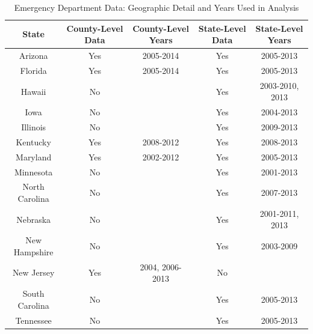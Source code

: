 \documentclass[12pt]{article}
\begin{document}
\begin{table}[]
\centering
\caption{Emergency Department Data: Geographic Detail and Years Used in Analysis}
\label{my-label}
\begin{tabular}{@{}ccccc@{}}
\toprule
State          & County-Level Data & County-Level Years           & State-Level Data & State-Level Years           \\ \midrule
Arizona        & Yes               & 2005-2014       & Yes              & 2005-2013       \\
Florida        & Yes               & 2005-2014       & Yes              & 2005-2013       \\
Hawaii         & No                &                 & Yes              & 2003-2010, 2013 \\
Iowa           & No                &                 & Yes              & 2004-2013       \\
Illinois       & No                &                 & Yes              & 2009-2013       \\
Kentucky       & Yes               & 2008-2012       & Yes              & 2008-2013       \\
Maryland       & Yes               & 2002-2012       & Yes              & 2005-2013       \\
Minnesota      & No                &                 & Yes              & 2001-2013       \\
North Carolina & No                &                 & Yes              & 2007-2013       \\
Nebraska       & No                &                 & Yes              & 2001-2011, 2013 \\
New Hampshire  & No                &                 & Yes              & 2003-2009       \\
New Jersey     & Yes               & 2004, 2006-2013 & No               &                 \\
South Carolina & No                &                 & Yes              & 2005-2013       \\
Tennessee      & No                &                 & Yes              & 2005-2013       \\

\end{tabular}
\end{table}
\end{document}

